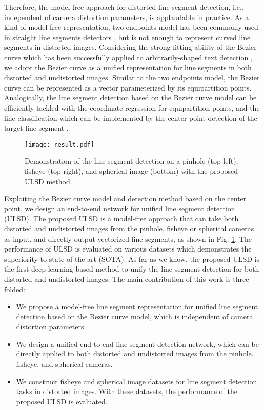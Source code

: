 \documentclass[letterpaper, 10 pt, conference]{ieeeconf}
\begin{document}
Therefore, the model-free approach for distorted line segment detection, i.e., independent of camera distortion parameters, is applaudable in practice. As a kind of model-free representation, two endpoints model has been commonly used in straight line segments detectors \cite{AFMPAMI,LCNN,HAWP}, but is not enough to represent curved line segments in distorted images. Considering the strong fitting ability of the Bezier curve which has been successfully applied to arbitrarily-shaped text detection \cite{ABCNet}, we adopt the Bezier curve as a unified representation for line segments in both distorted and undistorted images. Similar to the two endpoints model, the Bezier curve can be represented as a vector parameterized by its equipartition points. Analogically, the line segment detection based on the Bezier curve model can be efficiently tackled with the coordinate regression for equipartition points, and the line classification which can be implemented by the center point detection of the target line segment \cite{CenterNet}.

\begin{figure}[t]
	\begin{center}
		\texttt{[image: result.pdf]}
	\end{center}
	\caption{Demonstration of the line segment detection on a pinhole (top-left), fisheye (top-right), and spherical image (bottom) with the proposed ULSD method.}
	\label{fig:1}
\end{figure}

Exploiting the Bezier curve model and detection method based on the center point, we design an end-to-end network for unified line segment detection (ULSD). The proposed ULSD is a model-free approach that can take both distorted and undistorted images from the pinhole, fisheye or spherical cameras as input, and directly output vectorized line segments, as shown in Fig. \ref{fig:1}. The performance of ULSD is evaluated on various datasets which demonstrates the superiority to state-of-the-art (SOTA). As far as we know, the proposed ULSD is the first deep learning-based method to unify the line segment detection for both distorted and undistorted images. The main contribution of this work is three folded:
\begin{itemize}
	\item We propose a model-free line segment representation for unified line segment detection based on the Bezier curve model, which is independent of camera distortion parameters.
	\item We design a unified end-to-end line segment detection network, which can be directly applied to both distorted and undistorted images from the pinhole, fisheye, and spherical cameras.
	\item We construct fisheye and spherical image datasets for line segment detection tasks in distorted images. With these datasets, the performance of the proposed ULSD is evaluated.
\end{itemize}
\end{document}
